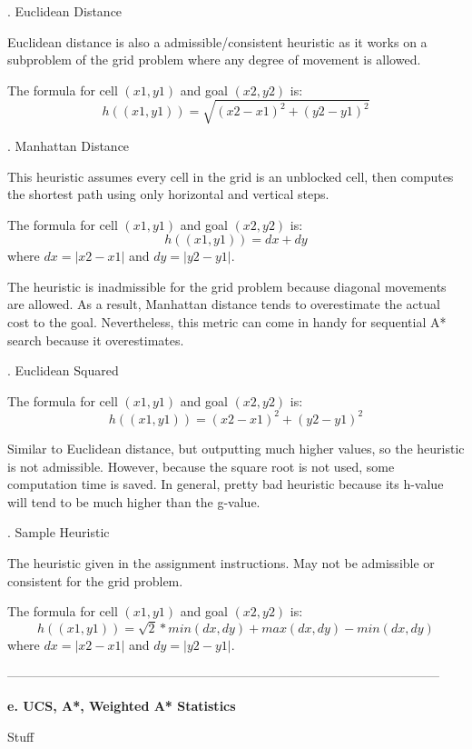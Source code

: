 \documentclass[12pt, letterpaper]{article}
\begin{document}
\bigskip
{}. Euclidean Distance

Euclidean distance is also a admissible/consistent heuristic as it works on a subproblem of the grid problem where any degree of movement is allowed.

The formula for cell $(x1, y1)$ and goal $(x2, y2)$ is:
$$h((x1,y1)) = \sqrt{(x2-x1)^2 + (y2-y1)^2}$$

\bigskip
{}. Manhattan Distance

This heuristic assumes every cell in the grid is an unblocked cell, then computes the shortest path using only horizontal and vertical steps.

The formula for cell $(x1, y1)$ and goal $(x2, y2)$ is:
$$h((x1, y1)) = dx + dy$$
where $dx = |x2 - x1|$ and $dy = |y2 - y1|$.

The heuristic is inadmissible for the grid problem because diagonal movements are allowed. As a result, Manhattan distance tends to overestimate the actual cost to the goal. Nevertheless, this metric can come in handy for sequential A* search because it overestimates.

\bigskip
{}. Euclidean Squared

The formula for cell $(x1, y1)$ and goal $(x2, y2)$ is:
$$h((x1,y1)) = (x2-x1)^2 + (y2-y1)^2$$

Similar to Euclidean distance, but outputting much higher values, so the heuristic is not admissible. However, because the square root is not used, some computation time is saved. In general, pretty bad heuristic because its h-value will tend to be much higher than the g-value.

\bigskip
{}. Sample Heuristic

The heuristic given in the assignment instructions. May not be admissible or consistent for the grid problem. 

The formula for cell $(x1, y1)$ and goal $(x2, y2)$ is:
$$h((x1,y1)) = \sqrt{2} * min(dx, dy) + max(dx, dy) - min(dx, dy)$$
where $dx = |x2 - x1|$ and $dy = |y2 - y1|$. 

\bigskip
\noindent------------------------------------------------------------------------------------------------------

\noindent \textbf{e. UCS, A*, Weighted A* Statistics}

Stuff
\end{document}

